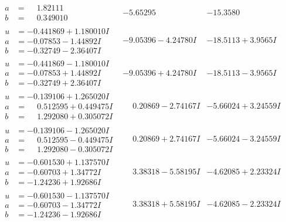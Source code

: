 \documentclass[1p]{elsarticle_modified}
\theoremstyle{definition}
\begin{document}
$$\begin{array}{c|c|c}
\begin{aligned}
a &= \phantom{-}1.82111\phantom{ +0.000000I} \\
b &= \phantom{-}0.349010\phantom{ +0.000000I}\end{aligned}
 & -5.65295\phantom{ +0.000000I} & -15.3580\phantom{ +0.000000I} \\ \hline\begin{aligned}
u &= -0.441869 + 1.180010 I \\
a &= -0.07853 - 1.44892 I \\
b &= -0.32749 - 2.36407 I\end{aligned}
 & -9.05396 - 4.24780 I & -18.5113 + 3.9565 I \\ \hline\begin{aligned}
u &= -0.441869 - 1.180010 I \\
a &= -0.07853 + 1.44892 I \\
b &= -0.32749 + 2.36407 I\end{aligned}
 & -9.05396 + 4.24780 I & -18.5113 - 3.9565 I \\ \hline\begin{aligned}
u &= -0.139106 + 1.265020 I \\
a &= \phantom{-}0.512595 + 0.449475 I \\
b &= \phantom{-}1.292080 + 0.305072 I\end{aligned}
 & \phantom{-}0.20869 - 2.74167 I & -5.66024 + 3.24559 I \\ \hline\begin{aligned}
u &= -0.139106 - 1.265020 I \\
a &= \phantom{-}0.512595 - 0.449475 I \\
b &= \phantom{-}1.292080 - 0.305072 I\end{aligned}
 & \phantom{-}0.20869 + 2.74167 I & -5.66024 - 3.24559 I \\ \hline\begin{aligned}
u &= -0.601530 + 1.137570 I \\
a &= -0.60703 + 1.34772 I \\
b &= -1.24236 + 1.92686 I\end{aligned}
 & \phantom{-}3.38318 - 5.58195 I & -4.62085 + 2.23324 I \\ \hline\begin{aligned}
u &= -0.601530 - 1.137570 I \\
a &= -0.60703 - 1.34772 I \\
b &= -1.24236 - 1.92686 I\end{aligned}
 & \phantom{-}3.38318 + 5.58195 I & -4.62085 - 2.23324 I \\ \hline\begin{aligned}

\end{aligned}
\end{array}$$
\end{document}

